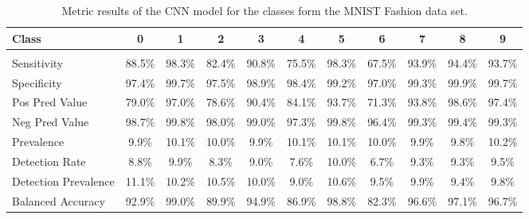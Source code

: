\documentclass{article}
\begin{document}
\begin{table}[]\caption{Metric results of the CNN model for the classes form the MNIST Fashion data set. }\label{tab2}
\centering
\begin{tabular}{ p{1.5cm} c c c c c c c c c c }
\toprule
Class	&	0	&	1	&	2	&	3	&	4	&	5	&	6	&	7	&	8	&	9	\\
\midrule \\
Sensitivity      	&	88.5\%	&	98.3\%	&	82.4\%	&	90.8\%	&	75.5\%	&	98.3\%	&	67.5\%	&	93.9\%	&	94.4\%	&	93.7\%	\\
Specificity       	&	97.4\%	&	99.7\%	&	97.5\%	&	98.9\%	&	98.4\%	&	99.2\%	&	97.0\%	&	99.3\%	&	99.9\%	&	99.7\%	\\
Pos Pred Value    	&	79.0\%	&	97.0\%	&	78.6\%	&	90.4\%	&	84.1\%	&	93.7\%	&	71.3\%	&	93.8\%	&	98.6\%	&	97.4\%	\\
Neg Pred Value     	&	98.7\%	&	99.8\%	&	98.0\%	&	99.0\%	&	97.3\%	&	99.8\%	&	96.4\%	&	99.3\%	&	99.4\%	&	99.3\%	\\
Prevalence        	&	9.9\%	&	10.1\%	&	10.0\%	&	9.9\%	&	10.1\%	&	10.1\%	&	10.0\%	&	9.9\%	&	9.8\%	&	10.2\%	\\
Detection Rate    	&	8.8\%	&	9.9\%	&	8.3\%	&	9.0\%	&	7.6\%	&	10.0\%	&	6.7\%	&	9.3\%	&	9.3\%	&	9.5\%	\\
Detection Prevalence 	&	11.1\%	&	10.2\%	&	10.5\%	&	10.0\%	&	9.0\%	&	10.6\%	&	9.5\%	&	9.9\%	&	9.4\%	&	9.8\%	\\
Balanced Accuracy   	&	92.9\%	&	99.0\%	&	89.9\%	&	94.9\%	&	86.9\%	&	98.8\%	&	82.3\%	&	96.6\%	&	97.1\%	&	96.7\%	\\
\bottomrule
\end{tabular}
\end{table}
\end{document}
